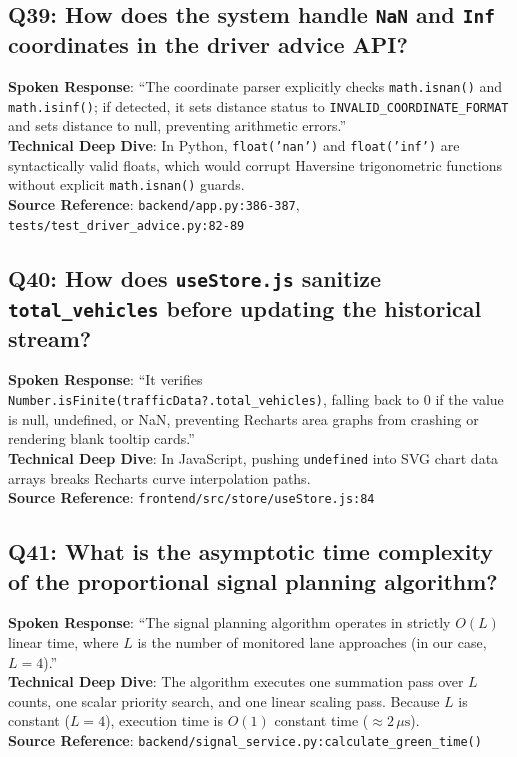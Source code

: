 \subsection*{Q39: How does the system handle \texttt{NaN} and \texttt{Inf} coordinates in the driver advice API?}
\begin{interviewbox}
\textbf{Spoken Response}: ``The coordinate parser explicitly checks \texttt{math.isnan()} and \texttt{math.isinf()}; if detected, it sets distance status to \texttt{INVALID\_COORDINATE\_FORMAT} and sets distance to null, preventing arithmetic errors.''\\
\textbf{Technical Deep Dive}: In Python, \texttt{float('nan')} and \texttt{float('inf')} are syntactically valid floats, which would corrupt Haversine trigonometric functions without explicit \texttt{math.isnan()} guards.\\
\textbf{Source Reference}: \texttt{backend/app.py:386-387}, \texttt{tests/test\_driver\_advice.py:82-89}
\end{interviewbox}

\subsection*{Q40: How does \texttt{useStore.js} sanitize \texttt{total\_vehicles} before updating the historical stream?}
\begin{interviewbox}
\textbf{Spoken Response}: ``It verifies \texttt{Number.isFinite(trafficData?.total\_vehicles)}, falling back to 0 if the value is null, undefined, or NaN, preventing Recharts area graphs from crashing or rendering blank tooltip cards.''\\
\textbf{Technical Deep Dive}: In JavaScript, pushing \texttt{undefined} into SVG chart data arrays breaks Recharts curve interpolation paths.\\
\textbf{Source Reference}: \texttt{frontend/src/store/useStore.js:84}
\end{interviewbox}

\subsection*{Q41: What is the asymptotic time complexity of the proportional signal planning algorithm?}
\begin{interviewbox}
\textbf{Spoken Response}: ``The signal planning algorithm operates in strictly $O(L)$ linear time, where $L$ is the number of monitored lane approaches (in our case, $L = 4$).''\\
\textbf{Technical Deep Dive}: The algorithm executes one summation pass over $L$ counts, one scalar priority search, and one linear scaling pass. Because $L$ is constant ($L=4$), execution time is $O(1)$ constant time ($\approx 2\,\mu\text{s}$).\\
\textbf{Source Reference}: \texttt{backend/signal\_service.py:calculate\_green\_time()}
\end{interviewbox}

